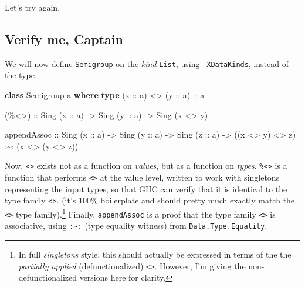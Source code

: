 \documentclass[]{article}
\newenvironment{Shaded}{}{}
\newcommand{\DataTypeTok}[1]{\textcolor[rgb]{0.56,0.13,0.00}{#1}}
\newcommand{\KeywordTok}[1]{\textcolor[rgb]{0.00,0.44,0.13}{\textbf{#1}}}
\newcommand{\NormalTok}[1]{#1}
\newcommand{\OperatorTok}[1]{\textcolor[rgb]{0.40,0.40,0.40}{#1}}
\newcommand{\OtherTok}[1]{\textcolor[rgb]{0.00,0.44,0.13}{#1}}
\begin{document}
Let's try again.

\subsection{Verify me, Captain}\label{verify-me-captain}

We will now define \texttt{Semigroup} on the \emph{kind} \texttt{List}, using
\texttt{-XDataKinds}, instead of the type.

\begin{Shaded}
\begin{Highlighting}[]
\KeywordTok{class} \DataTypeTok{Semigroup}\NormalTok{ a }\KeywordTok{where}
    \KeywordTok{type}\NormalTok{ (}\OtherTok{x ::}\NormalTok{ a) }\OperatorTok{\textless{}\textgreater{}}\NormalTok{ (}\OtherTok{y ::}\NormalTok{ a)}\OtherTok{ ::}\NormalTok{ a}

\OtherTok{    (\%\textless{}\textgreater{}) ::} \DataTypeTok{Sing}\NormalTok{ (}\OtherTok{x ::}\NormalTok{ a) }\OtherTok{{-}\textgreater{}} \DataTypeTok{Sing}\NormalTok{ (}\OtherTok{y ::}\NormalTok{ a) }\OtherTok{{-}\textgreater{}} \DataTypeTok{Sing}\NormalTok{ (x }\OperatorTok{\textless{}\textgreater{}}\NormalTok{ y)}

\NormalTok{    appendAssoc}
\OtherTok{        ::} \DataTypeTok{Sing}\NormalTok{ (}\OtherTok{x ::}\NormalTok{ a)}
        \OtherTok{{-}\textgreater{}} \DataTypeTok{Sing}\NormalTok{ (}\OtherTok{y ::}\NormalTok{ a)}
        \OtherTok{{-}\textgreater{}} \DataTypeTok{Sing}\NormalTok{ (}\OtherTok{z ::}\NormalTok{ a)}
        \OtherTok{{-}\textgreater{}}\NormalTok{ ((x }\OperatorTok{\textless{}\textgreater{}}\NormalTok{ y) }\OperatorTok{\textless{}\textgreater{}}\NormalTok{ z) }\OperatorTok{:\textasciitilde{}:}\NormalTok{ (x }\OperatorTok{\textless{}\textgreater{}}\NormalTok{ (y }\OperatorTok{\textless{}\textgreater{}}\NormalTok{ z))}
\end{Highlighting}
\end{Shaded}

Now, \texttt{\textless{}\textgreater{}} exists not as a function on
\emph{values}, but as a function on \emph{types}.
\texttt{\%\textless{}\textgreater{}} is a function that performs
\texttt{\textless{}\textgreater{}} at the value level, written to work with
singletons representing the input types, so that GHC can verify that it is
identical to the type family \texttt{\textless{}\textgreater{}}. (it's 100\%
boilerplate and should pretty much exactly match the
\texttt{\textless{}\textgreater{}} type family).\footnote{In full
  \emph{singletons} style, this should actually be expressed in terms of the the
  \emph{partially applied} (defunctionalized)
  \texttt{\textless{}\textgreater{}}. However, I'm giving the
  non-defunctionalized versions here for clarity.} Finally, \texttt{appendAssoc}
is a proof that the type family \texttt{\textless{}\textgreater{}} is
associative, using \texttt{:\textasciitilde{}:} (type equality witness) from
\texttt{Data.Type.Equality}.
\end{document}
